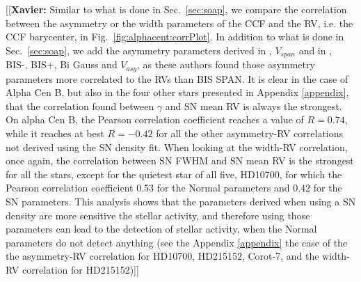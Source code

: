 \documentclass{aa}
\newcommand{\xavier}[1]{{\color{blue}[[\textbf{Xavier: }#1]]}}
\begin{document}
\xavier{Similar to what is done in Sec.~\ref{sec:soap}, we compare the correlation between the asymmetry or the width parameters of the CCF and the RV, i.e. the CCF barycenter, in Fig.~\ref{fig:alphacent:corrPlot}. In addition to what is done in Sec.~\ref{sec:soap}, we add the asymmetry parameters derived in \citet{Boisse-2011}, $V_{span}$ and in \citet{Figueira-2013}, BIS-, BIS+, Bi Gauss and $V_{asy}$, as these authors found those asymmetry parameters more correlated to the RVs than BIS SPAN. It is clear in the case of Alpha Cen B, but also in the four other stars presented in Appendix \ref{appendix}, that the correlation found between $\gamma$ and SN mean RV is always the strongest. On alpha Cen B, the Pearson correlation coefficient reaches a value of $R=0.74$, while it reaches at best $R=-0.42$ for all the other asymmetry-RV correlations not derived using the SN density fit. When looking at the width-RV correlation, once again, the correlation between SN FWHM and SN mean RV is the strongest for all the stars, except for the quietest star of all five, HD10700, for which the Pearson correlation coefficient 0.53 for the Normal parameters and 0.42 for the SN parameters. This analysis shows that the parameters derived when using a SN density are more sensitive the stellar activity, and therefore using those parameters can lead to the detection of stellar activity, when the Normal parameters do not detect anything (see the Appendix \ref{appendix} the case of the the asymmetry-RV correlation for HD10700, HD215152, Corot-7, and the width-RV correlation for HD215152)}

\end{document}
